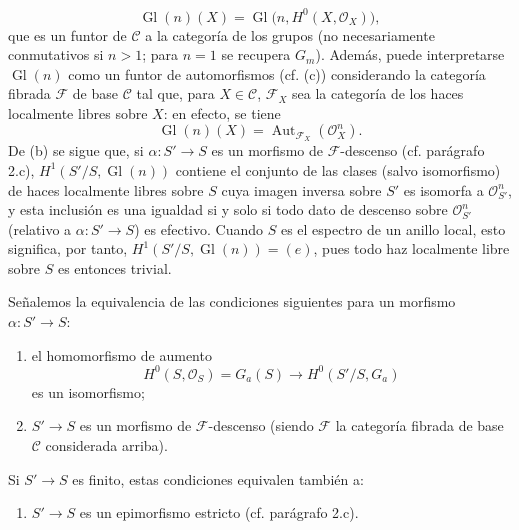 \[
  \operatorname{Gl}(n)(X)=
  \operatorname{Gl}\bigl(n,H^0(X,\mathcal O_X)\bigr),
\]
que es un funtor de $\mathcal C$ a la categoría de los grupos (no
necesariamente conmutativos si $n>1$; para $n=1$ se recupera $G_m$). Además,
puede interpretarse $\operatorname{Gl}(n)$ como un funtor de automorfismos
(cf. (c)) considerando la categoría fibrada $\mathcal F$ de base $\mathcal C$
tal que, para $X\in\mathcal C$, $\mathcal F_X$ sea la categoría de los haces
localmente libres sobre $X$: en efecto, se tiene
\[
  \operatorname{Gl}(n)(X)=
  \operatorname{Aut}_{\mathcal F_X}(\mathcal O_X^n).
\]
De (b) se sigue que, si $\alpha:S'\longrightarrow S$ es un morfismo de
$\mathcal F$-descenso (cf. parágrafo 2.c),
$H^1(S'/S,\operatorname{Gl}(n))$ contiene el conjunto de las clases (salvo
isomorfismo) de haces localmente libres sobre $S$ cuya imagen inversa sobre
$S'$ es isomorfa a $\mathcal O_{S'}^n$, y esta inclusión es una igualdad si y
solo si todo dato de descenso sobre $\mathcal O_{S'}^n$ (relativo a
$\alpha:S'\longrightarrow S$) es efectivo. Cuando $S$ es el espectro de un
anillo local, esto significa, por tanto,
$H^1(S'/S,\operatorname{Gl}(n))=(e)$, pues todo haz localmente libre sobre $S$
es entonces trivial.

Señalemos la equivalencia de las condiciones siguientes para un morfismo
$\alpha:S'\longrightarrow S$:
\begin{enumerate}
\item[(i)] el homomorfismo de aumento
\[
  H^0(S,\mathcal O_S)=G_a(S)\longrightarrow H^0(S'/S,G_a)
\]
es un isomorfismo;
\item[(ii)] $S'\longrightarrow S$ es un morfismo de $\mathcal F$-descenso
(siendo $\mathcal F$ la categoría fibrada de base $\mathcal C$ considerada
arriba).
\end{enumerate}
Si $S'\longrightarrow S$ es finito, estas condiciones equivalen también a:
\begin{enumerate}
\item[(iii)] $S'\longrightarrow S$ es un epimorfismo estricto
(cf. parágrafo 2.c).
\end{enumerate}

